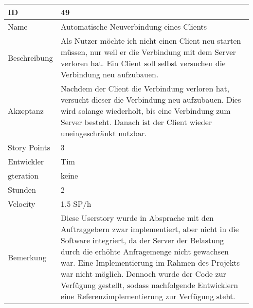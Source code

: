 \begin{table}[htbp]
    \begin{minipage}{\linewidth}
        \setlength{\tymax}{0.5\linewidth}
        \centering
        \small
        \begin{tabulary}{\textwidth}{|l|p{10cm}|} \hline
            ID   &49\\\hline
            Name  &Automatische Neuverbindung eines Clients\\\hline
            Beschreibung&Als Nutzer möchte ich nicht einen Client neu starten müssen, nur weil er die Verbindung mit dem Server verloren hat. Ein Client soll selbst versuchen die Verbindung neu aufzubauen.\\\hline
            Akzeptanz &Nachdem der Client die Verbindung verloren hat, versucht dieser die Verbindung neu aufzubauen. Dies wird solange wiederholt, bis eine Verbindung zum Server besteht. Danach ist der Client wieder uneingeschränkt nutzbar.\\\hline
            Story Points&3\\\hline
            Entwickler &Tim\\\hline
            gteration &keine\\\hline
            Stunden  &2\\\hline
            Velocity &1.5 SP\slash h\\\hline
            Bemerkung & Diese Userstory wurde in Absprache mit den Auftraggebern zwar implementiert, aber nicht in die Software integriert, da der Server der Belastung durch die erhöhte Anfragemenge nicht gewachsen war. Eine Implementierung im Rahmen des Projekts war nicht möglich. Dennoch wurde der Code zur Verfügung gestellt, sodass nachfolgende Entwicklern eine Referenzimplementierung zur Verfügung steht.\\\hline
        \end{tabulary}
    \end{minipage}
\end{table}
